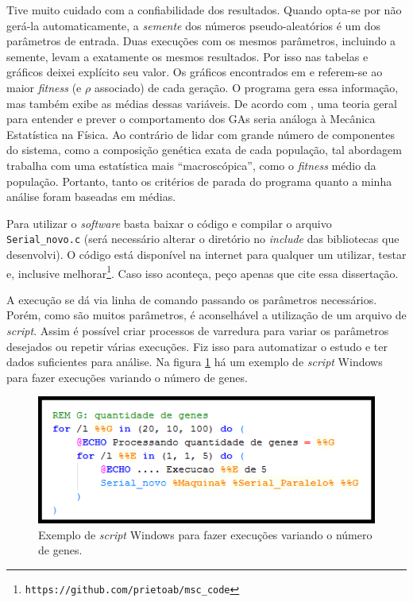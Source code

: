 	Tive muito cuidado com a confiabilidade dos resultados. Quando opta-se por não gerá-la automaticamente, a \emph{semente} dos números pseudo-aleatórios é um dos parâmetros de entrada. Duas execuções com os mesmos parâmetros, incluindo a semente, levam a exatamente os mesmos resultados. Por isso nas tabelas e gráficos deixei explícito seu valor. Os gráficos encontrados em \cite{metodo2004} e \cite{metodo2011} referem-se ao maior \emph{fitness} (e $\rho$ associado) de cada geração. O programa gera essa informação, mas também exibe as médias dessas variáveis. De acordo com \cite{Mitchell98}, uma teoria geral para entender e prever o comportamento dos GAs seria análoga à Mecânica Estatística na Física. Ao contrário de lidar com grande número de componentes do sistema, como a composição genética exata de cada população, tal abordagem trabalha com uma estatística mais ``macroscópica'', como o \emph{fitness} médio da população. Portanto, tanto os critérios de parada do programa quanto a minha análise foram baseadas em médias.
	
	Para utilizar o \emph{software} basta baixar o código e compilar o arquivo \texttt{Serial\_novo.c} (será necessário alterar o diretório no \emph{include} das bibliotecas que desenvolvi). O código está disponível na internet para qualquer um utilizar, testar e, inclusive melhorar\footnote{\texttt{https://github.com/prietoab/msc\_code}}. Caso isso aconteça, peço apenas que cite essa dissertação.
	
		A execução se dá via linha de comando passando os parâmetros necessários. Porém, como são muitos parâmetros, é aconselhável a utilização de um arquivo de \emph{script}. Assim é possível criar processos de varredura para variar os parâmetros desejados ou repetir várias execuções. Fiz isso para automatizar o estudo e ter dados suficientes para análise. Na figura \ref{fig:script_windows} há um exemplo de \emph{script} Windows para fazer execuções variando o número de genes.
			
		\begin{figure}[htbp]
			\centering
				\includegraphics{figs/materiais_metodo/software/script_windows.png}
			\caption{Exemplo de \emph{script} Windows para fazer execuções variando o número de genes.}
			\label{fig:script_windows}
		\end{figure}

